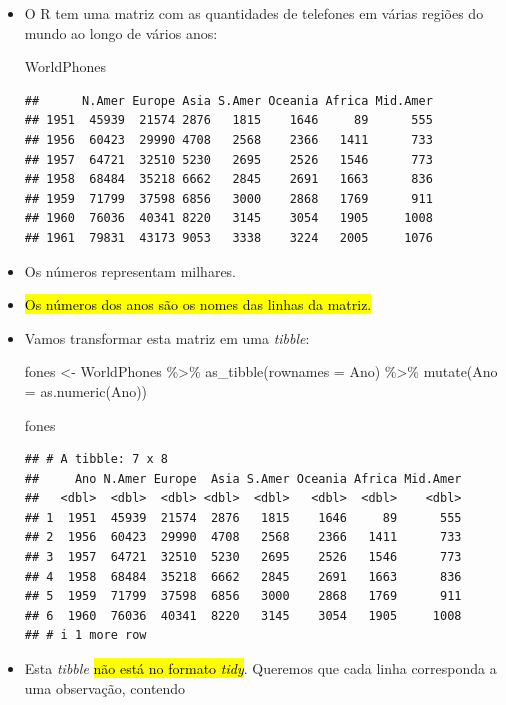 \documentclass[
  11pt]{report}
\newenvironment{Shaded}{\begin{snugshade}}{\end{snugshade}}
\newcommand{\AttributeTok}[1]{\textcolor[rgb]{0.77,0.63,0.00}{#1}}
\newcommand{\FunctionTok}[1]{\textcolor[rgb]{0.00,0.00,0.00}{#1}}
\newcommand{\NormalTok}[1]{#1}
\newcommand{\OtherTok}[1]{\textcolor[rgb]{0.56,0.35,0.01}{#1}}
\newcommand{\SpecialCharTok}[1]{\textcolor[rgb]{0.00,0.00,0.00}{#1}}
\newcommand{\StringTok}[1]{\textcolor[rgb]{0.31,0.60,0.02}{#1}}
\renewenvironment{Shaded}{
    \begin{mdframed}[%
      roundcorner=2pt,%
      innerleftmargin=5pt,%
      innerrightmargin=5pt,%
      topline=true,%
      leftline=true,%
      rightline=true,%
      bottomline=true,%
      linewidth=0.5pt,%
      linecolor=black!20,%
      backgroundcolor=black!2,%
      skipabove=2ex,%
      skipbelow=2.5ex%
    ]%
  }
  {
    \end{mdframed}
  }
\begin{document}
\begin{itemize}
\item
  O R tem uma matriz com as quantidades de telefones em várias regiões do mundo ao longo de vários anos:

\begin{Shaded}
\begin{Highlighting}[]
\NormalTok{WorldPhones}
\end{Highlighting}
\end{Shaded}

\begin{verbatim}
##      N.Amer Europe Asia S.Amer Oceania Africa Mid.Amer
## 1951  45939  21574 2876   1815    1646     89      555
## 1956  60423  29990 4708   2568    2366   1411      733
## 1957  64721  32510 5230   2695    2526   1546      773
## 1958  68484  35218 6662   2845    2691   1663      836
## 1959  71799  37598 6856   3000    2868   1769      911
## 1960  76036  40341 8220   3145    3054   1905     1008
## 1961  79831  43173 9053   3338    3224   2005     1076
\end{verbatim}
\item
  Os números representam milhares.
\item
  {\hl{Os números dos anos são os nomes das linhas da matriz.}}
\item
  Vamos transformar esta matriz em uma \emph{tibble}:

\begin{Shaded}
\begin{Highlighting}[]
\NormalTok{fones }\OtherTok{\textless{}{-}}\NormalTok{ WorldPhones }\SpecialCharTok{\%\textgreater{}\%} 
  \FunctionTok{as\_tibble}\NormalTok{(}\AttributeTok{rownames =} \StringTok{\textquotesingle{}Ano\textquotesingle{}}\NormalTok{) }\SpecialCharTok{\%\textgreater{}\%} 
  \FunctionTok{mutate}\NormalTok{(}\AttributeTok{Ano =} \FunctionTok{as.numeric}\NormalTok{(Ano))}

\NormalTok{fones}
\end{Highlighting}
\end{Shaded}

\begin{verbatim}
## # A tibble: 7 x 8
##     Ano N.Amer Europe  Asia S.Amer Oceania Africa Mid.Amer
##   <dbl>  <dbl>  <dbl> <dbl>  <dbl>   <dbl>  <dbl>    <dbl>
## 1  1951  45939  21574  2876   1815    1646     89      555
## 2  1956  60423  29990  4708   2568    2366   1411      733
## 3  1957  64721  32510  5230   2695    2526   1546      773
## 4  1958  68484  35218  6662   2845    2691   1663      836
## 5  1959  71799  37598  6856   3000    2868   1769      911
## 6  1960  76036  40341  8220   3145    3054   1905     1008
## # i 1 more row
\end{verbatim}
\item
  Esta \emph{tibble} {\hl{não está no formato \emph{tidy}}}. Queremos que cada linha corresponda a uma observação, contendo


\end{itemize}
\end{document}
